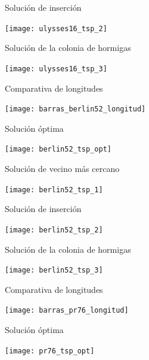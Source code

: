 \begin{frame}{Solución de inserción}
	\begin{center}
		\texttt{[image: ulysses16\_tsp\_2]}
	\end{center}
\end{frame}

\begin{frame}{Solución de la colonia de hormigas}
	\begin{center}
		\texttt{[image: ulysses16\_tsp\_3]}
	\end{center}
\end{frame}

\begin{frame}{Comparativa de longitudes}
	\begin{center}
		\texttt{[image: barras\_berlin52\_longitud]}
	\end{center}
\end{frame}

\begin{frame}{Solución óptima}
	\begin{center}
		\texttt{[image: berlin52\_tsp\_opt]}
	\end{center}
\end{frame}

\begin{frame}{Solución de vecino más cercano}
	\begin{center}
		\texttt{[image: berlin52\_tsp\_1]}
	\end{center}
\end{frame}

\begin{frame}{Solución de inserción}
	\begin{center}
		\texttt{[image: berlin52\_tsp\_2]}
	\end{center}
\end{frame}

\begin{frame}{Solución de la colonia de hormigas}
	\begin{center}
		\texttt{[image: berlin52\_tsp\_3]}
	\end{center}
\end{frame}

\begin{frame}{Comparativa de longitudes}
	\begin{center}
		\texttt{[image: barras\_pr76\_longitud]}
	\end{center}
	\end{frame}

\begin{frame}{Solución óptima}
	\begin{center}
		\texttt{[image: pr76\_tsp\_opt]}
	\end{center}
\end{frame}

